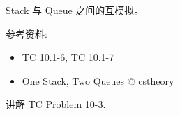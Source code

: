\documentclass[a4paper, justified]{tufte-handout}
\begin{document}
\begin{solution}
\end{solution}

\begin{problem}[TC 10.4-2]
\end{problem}

\begin{solution}
\end{solution}

\begin{problem}[TC 10.4-3]
\end{problem}

\begin{solution}
\end{solution}

\begin{problem}[TC Problem 10-3]
\end{problem}

\begin{solution}
\end{solution}

\beginoptional

\begin{problem}[TC 10.1-7]
\end{problem}

\begin{solution}
\end{solution}

\beginot

\begin{ot}

  Stack 与 Queue 之间的互模拟。

  \noindent 参考资料:
  \begin{itemize}
    \item TC 10.1-6, TC 10.1-7
    \item \href{https://cstheory.stackexchange.com/questions/2562/one-stack-two-queues}{One Stack, Two Queues @ cstheory}
  \end{itemize}
\end{ot}

\begin{ot}
  讲解 TC Problem 10-3.
\end{ot}
\end{document}
